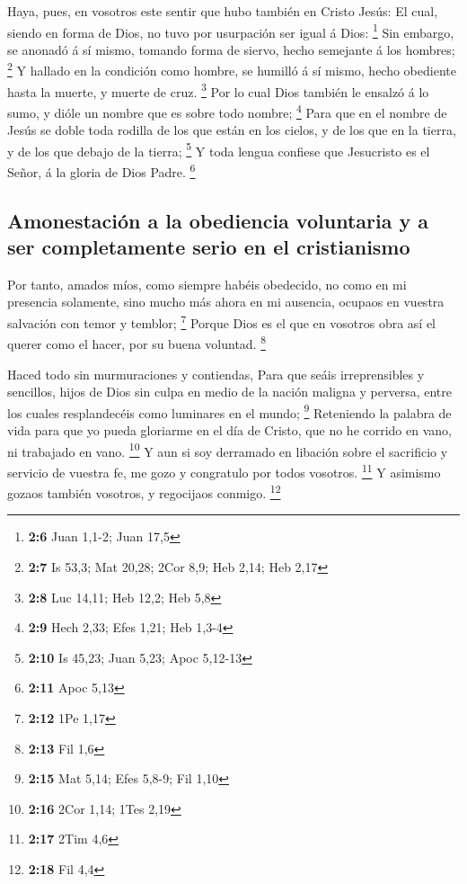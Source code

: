  Haya, pues, en vosotros este sentir que hubo también en
Cristo Jesús:  El cual, siendo en forma de Dios, no tuvo
por usurpación ser igual á Dios: \footnote{\textbf{2:6} Juan 1,1-2; Juan
  17,5}  Sin embargo, se anonadó á sí mismo, tomando forma
de siervo, hecho semejante á los hombres; \footnote{\textbf{2:7} Is
  53,3; Mat 20,28; 2Cor 8,9; Heb 2,14; Heb 2,17}  Y
hallado en la condición como hombre, se humilló á sí mismo, hecho
obediente hasta la muerte, y muerte de cruz. \footnote{\textbf{2:8} Luc
  14,11; Heb 12,2; Heb 5,8}  Por lo cual Dios también le
ensalzó á lo sumo, y dióle un nombre que es sobre todo nombre;
\footnote{\textbf{2:9} Hech 2,33; Efes 1,21; Heb 1,3-4} 
Para que en el nombre de Jesús se doble toda rodilla de los que están en
los cielos, y de los que en la tierra, y de los que debajo de la tierra;
\footnote{\textbf{2:10} Is 45,23; Juan 5,23; Apoc 5,12-13}
 Y toda lengua confiese que Jesucristo es el Señor, á la
gloria de Dios Padre. \footnote{\textbf{2:11} Apoc 5,13}

\hypertarget{amonestaciuxf3n-a-la-obediencia-voluntaria-y-a-ser-completamente-serio-en-el-cristianismo}{%
\subsection{Amonestación a la obediencia voluntaria y a ser
completamente serio en el
cristianismo}\label{amonestaciuxf3n-a-la-obediencia-voluntaria-y-a-ser-completamente-serio-en-el-cristianismo}}

 Por tanto, amados míos, como siempre habéis obedecido,
no como en mi presencia solamente, sino mucho más ahora en mi ausencia,
ocupaos en vuestra salvación con temor y temblor; \footnote{\textbf{2:12}
  1Pe 1,17}  Porque Dios es el que en vosotros obra así
el querer como el hacer, por su buena voluntad. \footnote{\textbf{2:13}
  Fil 1,6}

 Haced todo sin murmuraciones y contiendas,
 Para que seáis irreprensibles y sencillos, hijos de Dios
sin culpa en medio de la nación maligna y perversa, entre los cuales
resplandecéis como luminares en el mundo; \footnote{\textbf{2:15} Mat
  5,14; Efes 5,8-9; Fil 1,10}  Reteniendo la palabra de
vida para que yo pueda gloriarme en el día de Cristo, que no he corrido
en vano, ni trabajado en vano. \footnote{\textbf{2:16} 2Cor 1,14; 1Tes
  2,19}  Y aun si soy derramado en libación sobre el
sacrificio y servicio de vuestra fe, me gozo y congratulo por todos
vosotros. \footnote{\textbf{2:17} 2Tim 4,6}  Y asimismo
gozaos también vosotros, y regocijaos conmigo. \footnote{\textbf{2:18}
  Fil 4,4}

